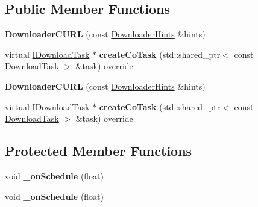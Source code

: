 \subsection*{Public Member Functions}
\begin{DoxyCompactItemize}
\item 
\mbox{\label{classcocos2d_1_1network_1_1DownloaderCURL_a1d8e795189714faf2f1d404243f782ff}} 
{\bfseries Downloader\+C\+U\+RL} (const \hyperlink{classcocos2d_1_1network_1_1DownloaderHints}{Downloader\+Hints} \&hints)
\item 
\mbox{\label{classcocos2d_1_1network_1_1DownloaderCURL_a1e65c471e5ca737aa6423268b1c19026}} 
virtual \hyperlink{classcocos2d_1_1network_1_1IDownloadTask}{I\+Download\+Task} $\ast$ {\bfseries create\+Co\+Task} (std\+::shared\+\_\+ptr$<$ const \hyperlink{classcocos2d_1_1network_1_1DownloadTask}{Download\+Task} $>$ \&task) override
\item 
\mbox{\label{classcocos2d_1_1network_1_1DownloaderCURL_a1d8e795189714faf2f1d404243f782ff}} 
{\bfseries Downloader\+C\+U\+RL} (const \hyperlink{classcocos2d_1_1network_1_1DownloaderHints}{Downloader\+Hints} \&hints)
\item 
\mbox{\label{classcocos2d_1_1network_1_1DownloaderCURL_ace91df838ecd53a4234995131fb38423}} 
virtual \hyperlink{classcocos2d_1_1network_1_1IDownloadTask}{I\+Download\+Task} $\ast$ {\bfseries create\+Co\+Task} (std\+::shared\+\_\+ptr$<$ const \hyperlink{classcocos2d_1_1network_1_1DownloadTask}{Download\+Task} $>$ \&task) override
\end{DoxyCompactItemize}
\subsection*{Protected Member Functions}
\begin{DoxyCompactItemize}
\item 
\mbox{\label{classcocos2d_1_1network_1_1DownloaderCURL_aa8cc89a2be5bef0c3e303622fa45007b}} 
void {\bfseries \+\_\+on\+Schedule} (float)
\item 
\mbox{\label{classcocos2d_1_1network_1_1DownloaderCURL_aa8cc89a2be5bef0c3e303622fa45007b}} 
void {\bfseries \+\_\+on\+Schedule} (float)
\end{DoxyCompactItemize}
